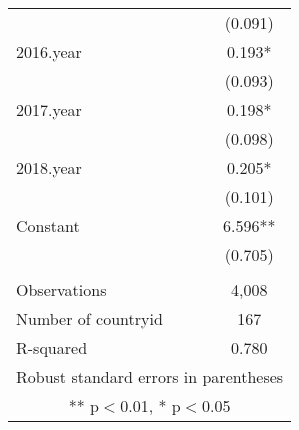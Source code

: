 \begin{tabular}{lc}
 & (0.091) \\
2016.year & 0.193* \\
 & (0.093) \\
2017.year & 0.198* \\
 & (0.098) \\
2018.year & 0.205* \\
 & (0.101) \\
Constant & 6.596** \\
 & (0.705) \\
 &  \\
Observations & 4,008 \\
Number of countryid & 167 \\
 R-squared & 0.780 \\ \hline
\multicolumn{2}{c}{ Robust standard errors in parentheses} \\
\multicolumn{2}{c}{ ** p$<$0.01, * p$<$0.05} \\
\end{tabular}

